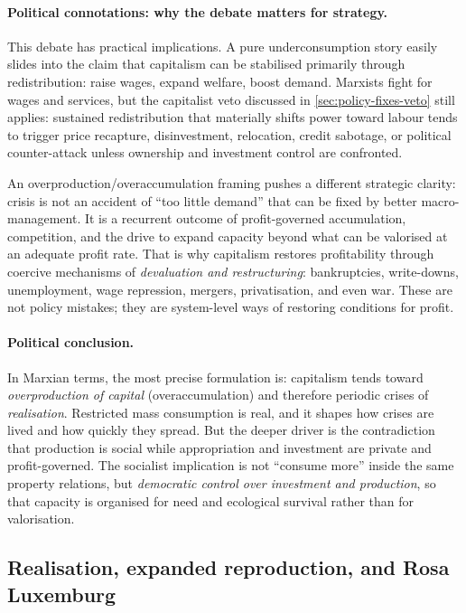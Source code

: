 \paragraph{Political connotations: why the debate matters for strategy.}
This debate has practical implications.
A pure underconsumption story easily slides into the claim that capitalism can be stabilised
primarily through redistribution: raise wages, expand welfare, boost demand.
Marxists fight for wages and services, but the capitalist veto discussed in
\cref{sec:policy-fixes-veto} still applies: sustained redistribution that materially shifts power toward labour
tends to trigger price recapture, disinvestment, relocation, credit sabotage, or political
counter-attack unless ownership and investment control are confronted.

An overproduction/overaccumulation framing pushes a different strategic clarity:
crisis is not an accident of “too little demand” that can be fixed by better macro-management.
It is a recurrent outcome of profit-governed accumulation, competition, and the drive to
expand capacity beyond what can be valorised at an adequate profit rate.
That is why capitalism restores profitability through coercive mechanisms of
\emph{devaluation and restructuring}: bankruptcies, write-downs, unemployment, wage
repression, mergers, privatisation, and even war.
These are not policy mistakes; they are system-level ways of restoring conditions for profit.

\paragraph{Political conclusion.}
In Marxian terms, the most precise formulation is:
capitalism tends toward \emph{overproduction of capital} (overaccumulation) and therefore
periodic crises of \emph{realisation}.
Restricted mass consumption is real, and it shapes how crises are lived and how quickly
they spread.
But the deeper driver is the contradiction that production is social while appropriation and
investment are private and profit-governed.
The socialist implication is not “consume more” inside the same property relations, but
\emph{democratic control over investment and production}, so that capacity is organised for
need and ecological survival rather than for valorisation.

\subsection{Realisation, expanded reproduction, and Rosa Luxemburg}
\label{sec:rosa-realisation}

